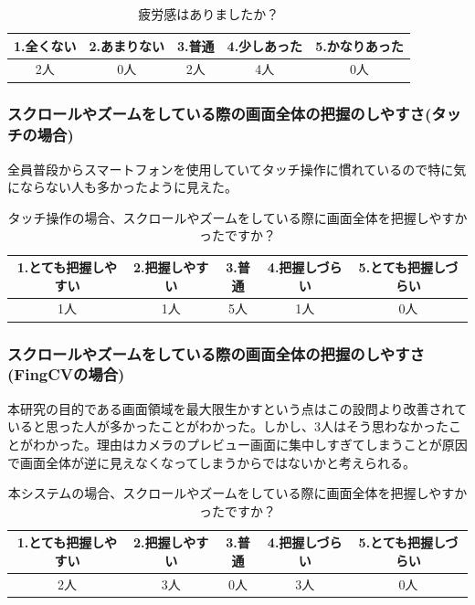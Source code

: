 \documentclass[11pt,a4j, titlepage]{jarticle} %
\begin{document}
\begin{table}[H]
	\begin{center}
	\begin{tabular}{|c|c|c|c|c|} \hline
		1.全くない & 2.あまりない & 3.普通 & 4.少しあった & 5.かなりあった \\ \hline \hline
		2人 & 0人 & 2人 & 4人 & 0人  \\ \hline
	\end{tabular}
	\caption{疲労感はありましたか？}
	\label{table4}
	\end{center}
\end{table}

\subsubsection{スクロールやズームをしている際の画面全体の把握のしやすさ(タッチの場合)}
全員普段からスマートフォンを使用していてタッチ操作に慣れているので特に気にならない人も多かったように見えた。

\begin{table}[H]
	\begin{center}
	\begin{tabular}{|c|c|c|c|c|} \hline
		1.とても把握しやすい & 2.把握しやすい & 3.普通 & 4.把握しづらい & 5.とても把握しづらい \\ \hline \hline
		1人 & 1人 & 5人 & 1人 & 0人  \\ \hline
	\end{tabular}
	\caption{タッチ操作の場合、スクロールやズームをしている際に画面全体を把握しやすかったですか？}
	\label{table5}
	\end{center}
\end{table}

\subsubsection{スクロールやズームをしている際の画面全体の把握のしやすさ(FingCVの場合)}
本研究の目的である画面領域を最大限生かすという点はこの設問より改善されていると思った人が多かったことがわかった。しかし、3人はそう思わなかったことがわかった。理由はカメラのプレビュー画面に集中しすぎてしまうことが原因で画面全体が逆に見えなくなってしまうからではないかと考えられる。

\begin{table}[H]
	\begin{center}
	\begin{tabular}{|c|c|c|c|c|} \hline
		1.とても把握しやすい & 2.把握しやすい & 3.普通 & 4.把握しづらい & 5.とても把握しづらい \\ \hline \hline
		2人 & 3人 & 0人 & 3人 & 0人  \\ \hline
	\end{tabular}
	\caption{本システムの場合、スクロールやズームをしている際に画面全体を把握しやすかったですか？}
	\label{table6}
	\end{center}
\end{table}
\end{document}
